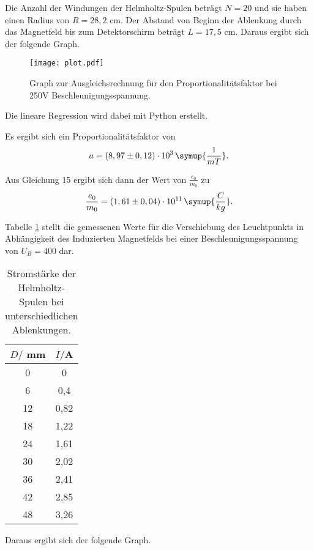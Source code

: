 Die Anzahl der Windungen der Helmholtz-Spulen beträgt $N=20$ und sie haben einen Radius von $R = 28,2$ cm.
Der Abstand von Beginn der Ablenkung durch das Magnetfeld bis zum Detektorschirm beträgt $L = 17,5$ cm.
Daraus ergibt sich der folgende Graph.

\begin{figure}[H]
  \centering
  \texttt{[image: plot.pdf]}
  \caption{Graph zur Ausgleichsrechnung für den Proportionalitätsfaktor bei 250V Beschleunigungsspannung.}
  \label{fig:plot}
\end{figure}

Die lineare Regression wird dabei mit Python erstellt.

Es ergibt sich ein Proportionalitätsfaktor von
\begin{equation*}
  a = (8,97 \pm 0,12)\cdot 10^3\, \symup{\frac{1}{mT}}.
\end{equation*}

Aus Gleichung 15 ergibt sich dann der Wert von $\frac{e_0}{m_0}$ zu
\begin{equation*}
  \frac{e_0}{m_0} = (1,61 \pm 0,04)\cdot 10^{11} \, \symup{\frac{C}{kg}}.
\end{equation*}



Tabelle \ref{tab:Magnetfeld1} stellt die gemessenen Werte für die Verschiebung des Leuchtpunkts in Abhängigkeit
des Induzierten Magnetfelds bei einer Beschleunigungsspannung von $U_B = 400$ dar.

\begin{table}[H]
  \centering
  \caption{Stromstärke der Helmholtz-Spulen bei unterschiedlichen Ablenkungen.}
  \label{tab:Magnetfeld1}
  \begin{tabular}{c c}
    \toprule
    $D/$ mm & $I/$A \\
    \midrule
    0 & 0 \\
    6 & 0,4 \\
    12 & 0,82 \\
    18 & 1,22 \\
    24 & 1,61 \\
    30 & 2,02 \\
    36 & 2,41 \\
    42 & 2,85 \\
    48 & 3,26 \\
    \bottomrule
  \end{tabular}
\end{table}

Daraus ergibt sich der folgende Graph.

